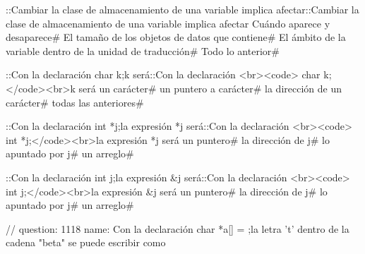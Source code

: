
\question ::Cambiar la clase de almacenamiento de una variable implica afectar::Cambiar la clase de almacenamiento de una variable implica afectar
\correctchoice Cuándo aparece y desaparece# 
\choice El tamaño de los objetos de datos que contiene# 
\choice El ámbito de la variable dentro de la unidad de traducción# 
\choice Todo lo anterior# 

\question ::Con la declaración  char k;k será::Con la declaración <br><code> char k;</code><br>k será
\correctchoice un carácter# 
\choice un puntero a carácter# 
\choice la dirección de un carácter# 
\choice todas las anteriores# 

\question ::Con la declaración  int *j;la expresión *j será::Con la declaración <br><code> int *j;</code><br>la expresión *j será
\choice un puntero# 
\choice la dirección de j# 
\correctchoice lo apuntado por j# 
\choice un arreglo# 

\question ::Con la declaración  int j;la expresión &j será::Con la declaración <br><code> int j;</code><br>la expresión &j será
\choice un puntero# 
\correctchoice la dirección de j# 
\choice lo apuntado por j# 
\choice un arreglo# 

\question // question: 1118  name: Con la declaración char *a[] = 
;la letra 't' dentro de la cadena "beta" se puede escribir como 

